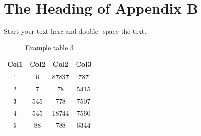 \documentclass[debug, font=Times]{gw-dissertation}[2021/11/19]
\begin{document}
\chapter{The Heading of Appendix B}
Start your text here and double- space the text.
\begin{table}[h!]
    \Centering
    \begin{tabular}{||c c c c||}
         \hline
         Col1 & Col2 & Col2 & Col3 \\ [0.5ex]
         \hline\hline
         1 & 6 & 87837 & 787 \\
         2 & 7 & 78 & 5415 \\
         3 & 545 & 778 & 7507 \\
         4 & 545 & 18744 & 7560 \\
         5 & 88 & 788 & 6344 \\ [1ex]
         \hline
    \end{tabular}
    \caption{Example table 3}
\end{table}
\end{document}
